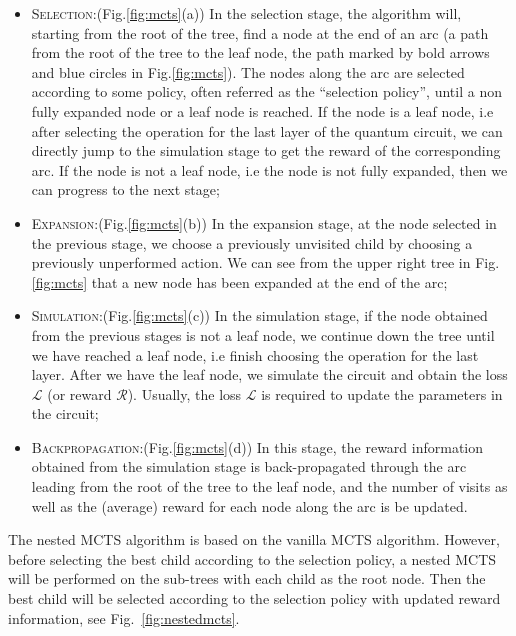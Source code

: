 \documentclass[a4paper,onecolumn,11pt]{quantumarticle}
\begin{document}
\begin{itemize}
    \item \textsc{Selection:}(Fig.\ref{fig:mcts}(a)) In the selection stage, the algorithm will, starting from the root of the tree, find a node at the end of an arc (a path from the root of the tree to the leaf node, the path marked by bold arrows and blue circles in Fig.\ref{fig:mcts}). The nodes along the arc are selected according to some policy, often referred as the ``selection policy'', until a non fully expanded node or a leaf node is reached. If the node is a leaf node, i.e after selecting the operation for the last layer of the quantum circuit, we can directly jump to the simulation stage to get the reward of the corresponding arc. If the node is not a leaf node, i.e the node is not fully expanded, then we can progress to the next stage;
    \item \textsc{Expansion:}(Fig.\ref{fig:mcts}(b)) In the expansion stage, at the node selected in the previous stage, we choose a previously unvisited child by choosing a previously unperformed action. We can see from the upper right tree in Fig.\ref{fig:mcts} that a new node has been expanded at the end of the arc; %
    \item \textsc{Simulation:}(Fig.\ref{fig:mcts}(c)) In the simulation stage, if the node obtained from the previous stages is not a leaf node, we continue down the tree until we have reached a leaf node, i.e finish choosing the operation for the last layer. After we have the leaf node, we simulate the circuit and obtain the loss $\mathcal{L}$ (or reward $\mathcal{R}$). Usually, the loss $\mathcal{L}$ is required to update the parameters in the circuit;
    \item \textsc{Backpropagation:}(Fig.\ref{fig:mcts}(d)) In this stage, the reward information obtained from the simulation stage is back-propagated through the arc leading from the root of the tree to the leaf node, and the number of visits as well as the (average) reward for each node along the arc is be updated.
\end{itemize}

The nested MCTS algorithm \cite{nestedmontecarlosearch} is based on the vanilla MCTS algorithm. However, before selecting the best child according to the selection policy, a nested MCTS will be performed on the sub-trees with each child as the root node. Then the best child will be selected according to the selection policy with updated reward information, see Fig.~\ref{fig:nestedmcts}.
\end{document}
